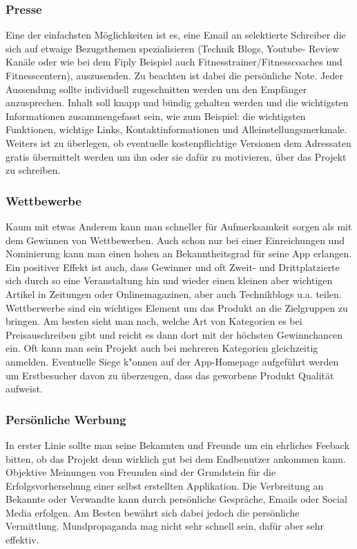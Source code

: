 \documentclass[FIPLY_base.tex]{subfiles}
\begin{document}
\subsubsection{Presse}
Eine der einfachsten Möglichkeiten ist es, eine Email an selektierte Schreiber die sich auf etwaige Bezugsthemen spezialisieren (Technik Blogs, Youtube- Review Kanäle oder wie bei dem Fiply Beispiel auch Fitnesstrainer/Fitnesscoaches und Fitnesscentern), auszusenden. Zu beachten ist dabei die persönliche Note. Jeder Aussendung sollte individuell zugeschnitten werden um den Empfänger anzusprechen. Inhalt soll knapp und bündig gehalten werden und die wichtigsten Informationen zusammengefasst sein, wie zum Beispiel: die wichtigsten Funktionen, wichtige Links, Kontaktinformationen und Alleinstellungsmerkmale. Weiters ist zu überlegen, ob eventuelle kostenpflichtige Versionen dem Adressaten gratis übermittelt werden um ihn oder sie dafür zu motivieren, über das Projekt zu schreiben. 

\subsubsection{Wettbewerbe}
Kaum mit etwas Anderem kann man schneller für Aufmerksamkeit sorgen als mit dem Gewinnen von Wettbewerben. Auch schon nur bei einer Einreichungen und Nominierung kann man einen hohen an Bekanntheitsgrad für seine App erlangen. Ein positiver Effekt ist auch, dass Gewinner und oft Zweit- und Drittplatzierte sich durch so eine Veranstaltung hin und wieder einen kleinen aber wichtigen Artikel in Zeitungen oder Onlinemagazinen, aber auch Technikblogs u.a. teilen. Wettberwerbe sind ein wichtiges Element um das Produkt an die Zielgruppen zu bringen. Am besten sieht man nach, welche Art von Kategorien es bei Preisauschreiben gibt und reicht es dann dort mit der höchsten Gewinnchancen ein. Oft kann man sein Projekt auch bei mehreren Kategorien gleichzeitig anmelden. 
\newline
Eventuelle Siege k"onnen auf der App-Homepage aufgeführt werden um Erstbesucher davon zu überzeugen, dass das geworbene Produkt Qualität aufweist.

\subsubsection{Persönliche Werbung}
In erster Linie sollte man seine Bekannten und Freunde um ein ehrliches Feeback bitten, ob das Projekt denn wirklich gut bei dem Endbenutzer ankommen kann. Objektive Meinungen von Freunden sind der Grundstein für die Erfolgsvorhersehung einer selbst erstellten Applikation. Die Verbreitung an Bekannte oder Verwandte kann durch persönliche Gespräche, Emails oder Social Media erfolgen. Am Besten bewährt sich dabei jedoch die persönliche Vermittlung. Mundpropaganda mag nicht sehr schnell sein, dafür aber sehr effektiv.
\end{document}
